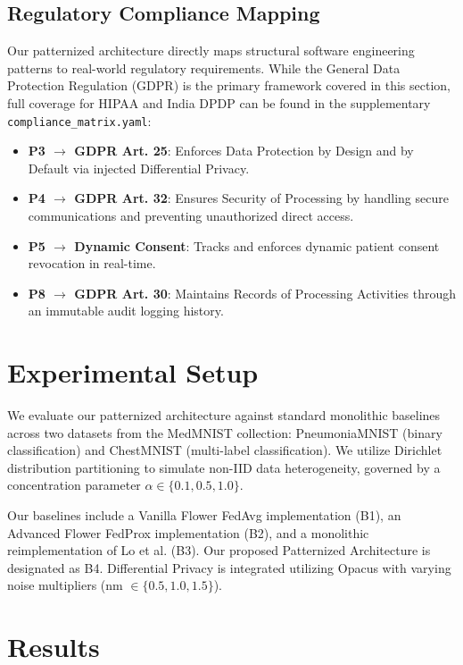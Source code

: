 \documentclass[10pt, conference]{IEEEtran}
\begin{document}
\subsection{Regulatory Compliance Mapping}
Our patternized architecture directly maps structural software engineering patterns to real-world regulatory requirements. While the General Data Protection Regulation (GDPR) is the primary framework covered in this section, full coverage for HIPAA and India DPDP can be found in the supplementary \texttt{compliance\_matrix.yaml}:
\begin{itemize}
    \item \textbf{P3 $\rightarrow$ GDPR Art. 25}: Enforces Data Protection by Design and by Default via injected Differential Privacy.
    \item \textbf{P4 $\rightarrow$ GDPR Art. 32}: Ensures Security of Processing by handling secure communications and preventing unauthorized direct access.
    \item \textbf{P5 $\rightarrow$ Dynamic Consent}: Tracks and enforces dynamic patient consent revocation in real-time.
    \item \textbf{P8 $\rightarrow$ GDPR Art. 30}: Maintains Records of Processing Activities through an immutable audit logging history.
\end{itemize}

\section{Experimental Setup}
We evaluate our patternized architecture against standard monolithic baselines across two datasets from the MedMNIST collection: PneumoniaMNIST (binary classification) and ChestMNIST (multi-label classification). We utilize Dirichlet distribution partitioning to simulate non-IID data heterogeneity, governed by a concentration parameter $\alpha \in \{0.1, 0.5, 1.0\}$. 

Our baselines include a Vanilla Flower FedAvg implementation (B1), an Advanced Flower FedProx implementation (B2), and a monolithic reimplementation of Lo et al. (B3). Our proposed Patternized Architecture is designated as B4. Differential Privacy is integrated utilizing Opacus with varying noise multipliers (nm $\in \{0.5, 1.0, 1.5\}$).

\section{Results}
\end{document}
